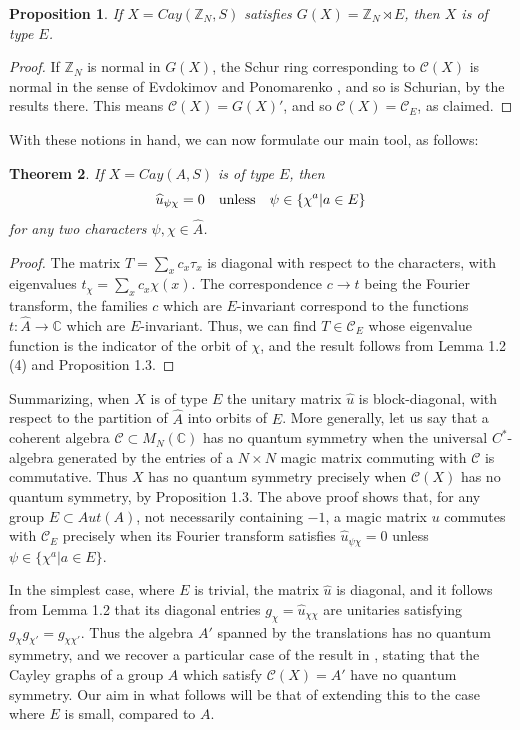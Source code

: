 \documentclass[11pt]{amsart}
\newtheorem{theorem}{Theorem}[section]
\newtheorem{proposition}[theorem]{Proposition}
\newcommand{\C}{\mathcal C}
\newcommand{\Z}{\mathbb Z}
\newcommand{\CC}{\mathbb C}
\newcommand{\hA}{\widehat A}
\newcommand{\hu}{\widehat u}
\begin{document}
\begin{proposition}
If $X=Cay(\Z_N,S)$ satisfies $G(X)=\Z_N\rtimes E$, then $X$ is of type $E$.
\end{proposition}

\begin{proof}
If $\Z_N$ is normal in $G(X)$, the Schur ring corresponding to $\C(X)$ is normal in the sense of Evdokimov and Ponomarenko \cite{ep}, and so is Schurian, by the results there. This means $\C(X)=G(X)'$, and so $\C(X)=\C_E$, as claimed.
\end{proof}

With these notions in hand, we can now formulate our main tool, as follows:

\begin{theorem}
If $X=Cay(A,S)$ is of type $E$, then
$$\hu_{\psi\chi}=0\quad{\rm unless}\quad\psi\in\{\chi^a|a\in E\}$$
for any two characters $\psi,\chi\in\hA$.
\end{theorem}

\begin{proof}
The matrix $T=\sum_xc_x\tau_x$ is diagonal with respect to the characters, with eigenvalues $t_\chi=\sum_xc_x\chi(x)$. The correspondence $c\to t$ being the Fourier transform, the families $c$ which are $E$-invariant correspond to the functions $t:\hA\to\CC$ which are $E$-invariant. Thus, we can find $T\in\C_E$ whose eigenvalue function is the indicator of the orbit of $\chi$, and the result follows from Lemma 1.2 (4) and Proposition 1.3.
\end{proof}

Summarizing, when $X$ is of type $E$ the unitary matrix $\hu$ is block-diagonal, with respect to the partition of $\hA$ into orbits of $E$. More generally, let us say that a coherent algebra $\C\subset M_N(\CC)$ has no quantum symmetry when the universal $C^*$-algebra generated by the entries of a $N\times N$ magic matrix commuting with $\C$ is commutative. Thus $X$ has no quantum symmetry precisely when $\C(X)$ has no quantum symmetry, by Proposition 1.3. The above proof shows that, for any group $E\subset Aut(A)$, not necessarily containing $-1$, a magic matrix $u$ commutes with $\C_E$ precisely when its Fourier transform satisfies $\hu_{\psi\chi}=0$ unless $\psi\in\{\chi^a|a\in E\}$.

In the simplest case, where $E$ is trivial, the matrix $\hu$ is diagonal, and it follows from Lemma 1.2 that its diagonal entries $g_\chi=\hu_{\chi\chi}$ are unitaries satisfying $g_\chi g_{\chi'}=g_{\chi\chi'}$. Thus the algebra $A'$ spanned by the translations has no quantum symmetry, and we recover a particular case of the result in \cite{mn}, stating that the Cayley graphs of a group $A$ which satisfy $\C(X)=A'$ have no quantum symmetry. Our aim in what follows will be that of extending this to the case where $E$ is small, compared to $A$.
\end{document}
